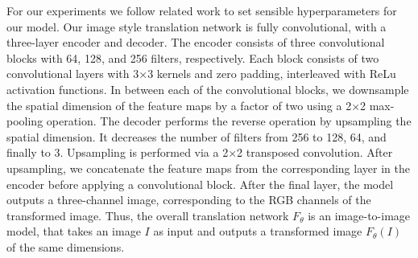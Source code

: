 For our experiments we follow related work \cite{unet,dslr-quality,raw-to-raw}
to set sensible hyperparameters for our model. Our image style translation
network is fully convolutional, with a three-layer encoder and decoder. The encoder consists of three convolutional blocks with 64, 128, and 256 filters, respectively. Each block consists of two convolutional layers with 3×3 kernels and zero padding, interleaved with ReLu activation functions.
In between each of the convolutional blocks, we downsample the spatial dimension
of the feature maps by a factor of two using a 2×2 max-pooling operation. The
decoder performs the reverse operation by upsampling the spatial
dimension. It decreases the number of filters from 256 to 128, 64, and finally
to 3. Upsampling is performed via a 2×2 transposed convolution. After
upsampling, we concatenate the feature maps from the corresponding layer in the
encoder before applying a convolutional block. After the final layer,
the model outputs a three-channel image, corresponding to the RGB channels of
the transformed image. Thus, the overall translation network $F_{\theta}$
is an image-to-image model, that takes an image $I$ as input and outputs a
transformed image $F_{\theta}(I)$ of the same dimensions. 


